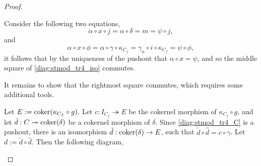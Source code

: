 \begin{proof}
\begin{enumerate}[label={(\bfseries TR\arabic*)}]
{\begin{center}
            \end{center}
            Consider the following two equations,
            \[
                \alpha \circ x \circ j = \alpha \circ \delta = m = \psi \circ j,
            \]
            and
            \[
                \alpha \circ x \circ \phi = \alpha \circ \gamma \circ \kappa_{C_f} = \gamma_n \circ i \circ \kappa_{C_f} = \psi \circ \phi,
            \]
            it follows that by the uniqueness of the pushout that \( \alpha \circ x = \psi \), and so the middle square of \autoref{diag:stmod_tr4_iso} commutes.
            
            It remains to show that the rightmost square commutes, which requires some additional tools.

            Let \( E := \operatorname{coker}(\kappa_{C_f} \circ g) \). Let \( c: I_{C_f} \twoheadrightarrow E \) be the cokernel morphism of \( \kappa_{C_f} \circ g \), and let \( \hat{d}: C \twoheadrightarrow \operatorname{coker}(\delta) \) be a cokernel morphism of \( \delta \). Since \autoref{diag:stmod_tr4_C} is a pushout, there is an isomorphism \( \tilde{d}: \operatorname{coker}(\delta) \to E \), such that \( \tilde{d} \circ \hat{d} = c \circ \gamma \). Let \( d := \tilde{d} \circ \hat{d} \). Then the following diagram,
            \begin{center}
\end{center}}
\end{enumerate}
\end{proof}
